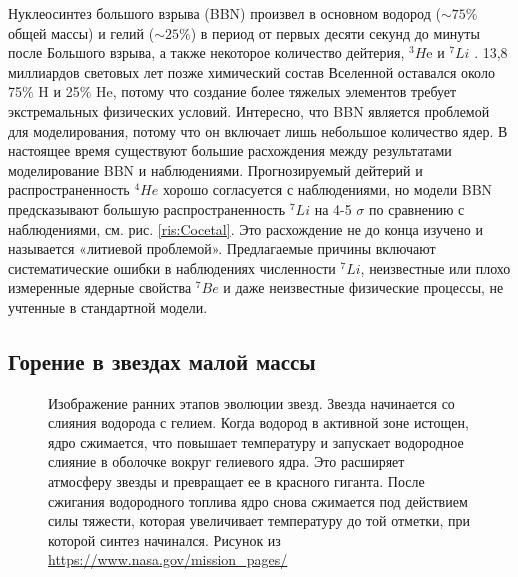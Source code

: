 \documentclass[%
master,    %
natbib,      %
subf,        %
href,        %
colorlinks,  %
]{disser}
\begin{document}
Нуклеосинтез большого взрыва (BBN) произвел в основном водород ($\sim75\%$ общей массы) и гелий ($\sim25\%$) в период от первых десяти секунд до минуты после Большого взрыва, а также некоторое количество дейтерия, $^3H$e и $^7Li$ \cite{Tytler}. 13,8 миллиардов световых лет позже химический состав Вселенной оставался около 75$\%$ H и 25$\%$ He, потому что создание более тяжелых элементов требует экстремальных физических условий. Интересно, что BBN является проблемой для моделирования, потому что он включает лишь небольшое количество ядер. В настоящее время существуют большие расхождения между результатами моделирование BBN и наблюдениями. Прогнозируемый дейтерий и распространенность $^4He$ хорошо согласуется с наблюдениями, но модели BBN предсказывают большую распространенность $^7Li$ на 4-5 $\sigma$ по сравнению с наблюдениями, см. рис. \ref{ris:Cocetal}. Это расхождение не до конца изучено и называется «литиевой проблемой». Предлагаемые причины включают систематические ошибки в наблюдениях численности $^7Li$, неизвестные или плохо измеренные ядерные свойства $^{7}Be$ и даже неизвестные физические процессы, не учтенные в стандартной модели.

\subsection{Горение в звездах малой массы}

\begin{figure}[h]
	\caption{Изображение ранних этапов эволюции звезд. Звезда начинается со слияния	водорода с гелием. Когда водород в активной зоне истощен, ядро сжимается, что повышает температуру и запускает водородное слияние в оболочке вокруг гелиевого ядра. Это расширяет атмосферу звезды и превращает ее в красного гиганта. После сжигания водородного топлива ядро снова сжимается под действием силы тяжести, которая увеличивает температуру до той отметки, при которой синтез начинался. Рисунок из \url{https://www.nasa.gov/mission\_pages/}}
	\label{ris:evolution}
\end{figure}
\end{document}
